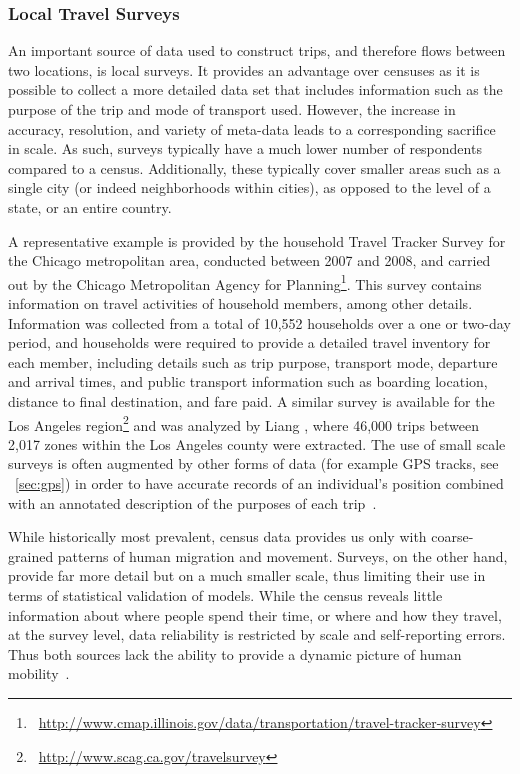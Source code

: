 \subsubsection{Local Travel Surveys}

An important source of data used to construct trips, and therefore flows between two locations, is local surveys. It provides an advantage over censuses as it is possible to collect a more detailed data set that includes information such as the purpose of the trip and mode of transport used. However, the increase in accuracy, resolution, and variety of meta-data leads to a corresponding sacrifice in scale. As such, surveys typically have a much lower number of respondents compared to a census. Additionally, these typically cover smaller areas such as a single city (or indeed neighborhoods within cities), as opposed to the level of a state, or an entire country.


A representative example is provided by the household Travel Tracker Survey for the Chicago metropolitan area, conducted between 2007 and 2008, and carried out by the Chicago Metropolitan Agency for Planning\footnote{~\url{http://www.cmap.illinois.gov/data/transportation/travel-tracker-survey}}. This survey contains information on travel activities of household members, among other details. Information was collected from a total of 10,552 households over a one or two-day period, and households were required to provide a detailed travel inventory for each member, including details such as trip purpose, transport mode, departure and arrival times, and public transport information such as boarding location, distance to final destination, and fare paid. 
%
A similar survey is available for the Los Angeles region\footnote{~\url{http://www.scag.ca.gov/travelsurvey}}
and was analyzed by Liang \et\cite{liang_2013_unraveling}, where 46,000 trips between 2,017 zones within the Los Angeles county were extracted.
The use of small scale surveys is often augmented by other forms of data (for example GPS tracks, see \sectionname~\ref{sec:gps}) in order to have accurate records of an individual's position combined with an annotated description of the purposes of each trip~\cite{liang_2013_unraveling, schneider_2013_unravelling}.

While historically most prevalent, census data provides us only with coarse-grained patterns of human migration and movement. Surveys, on the other hand, provide far more detail but on a much smaller scale, thus limiting their use in terms of statistical validation of models. While the census reveals little information about where people spend their time, or where and how they travel, at the survey level, data reliability is restricted by scale and self-reporting errors. Thus both sources lack the ability to provide a dynamic picture of human mobility~\cite{palmer_2013_new}.


